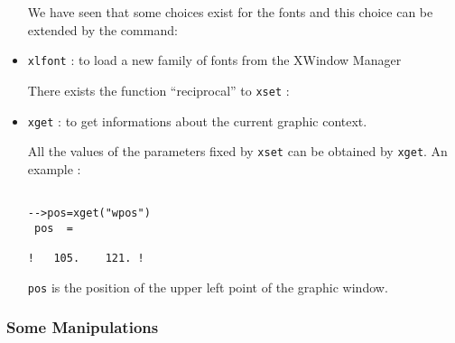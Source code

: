 \begin{itemize}
We have seen that some choices exist for the fonts and this choice can
be extended by the command:
        \item  {\tt xlfont}	: to load a new family of fonts from
the XWindow Manager


There exists the function ``reciprocal'' to {\tt xset} :

	\item  {\tt xget}	: to get informations about the
	current graphic context.

All the values of the parameters fixed by {\tt xset} can be obtained by 
{\tt xget}. An example :

\begin{verbatim}

-->pos=xget("wpos")
 pos  =
 
!   105.    121. !

\end{verbatim}

{\tt pos} is the position of the upper left point of the graphic window.
\end{itemize}
%

\subsubsection{Some Manipulations}

